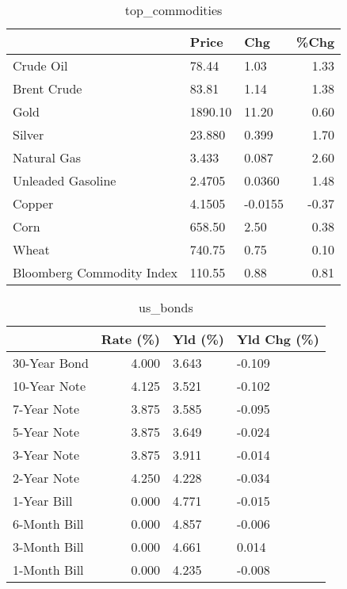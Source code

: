 \documentclass{article}%
\begin{document}
\begin{table}[htbp]%
\caption{top\_commodities}%
\centering%
\begin{adjustbox}{width=1\textwidth}%
\begin{tabular}{lllr}
\toprule
                          &   Price &     Chg &  \%Chg \\
\midrule
               Crude Oil  &   78.44 &    1.03 &  1.33 \\
             Brent Crude  &   83.81 &    1.14 &  1.38 \\
                    Gold  & 1890.10 &   11.20 &  0.60 \\
                  Silver  &  23.880 &   0.399 &  1.70 \\
             Natural Gas  &   3.433 &   0.087 &  2.60 \\
       Unleaded Gasoline  &  2.4705 &  0.0360 &  1.48 \\
                  Copper  &  4.1505 & -0.0155 & -0.37 \\
                    Corn  &  658.50 &    2.50 &  0.38 \\
                   Wheat  &  740.75 &    0.75 &  0.10 \\
Bloomberg Commodity Index &  110.55 &    0.88 &  0.81 \\
\bottomrule
\end{tabular}
%
\end{adjustbox}%
\end{table}

%


\begin{table}[htbp]%
\caption{us\_bonds}%
\centering%
\begin{adjustbox}{width=1\textwidth}%
\begin{tabular}{lrll}
\toprule
             &  Rate (\%) & Yld (\%) & Yld Chg (\%) \\
\midrule
30-Year Bond &     4.000 &   3.643 &      -0.109 \\
10-Year Note &     4.125 &   3.521 &      -0.102 \\
 7-Year Note &     3.875 &   3.585 &      -0.095 \\
 5-Year Note &     3.875 &   3.649 &      -0.024 \\
 3-Year Note &     3.875 &   3.911 &      -0.014 \\
 2-Year Note &     4.250 &   4.228 &      -0.034 \\
 1-Year Bill &     0.000 &   4.771 &      -0.015 \\
6-Month Bill &     0.000 &   4.857 &      -0.006 \\
3-Month Bill &     0.000 &   4.661 &       0.014 \\
1-Month Bill &     0.000 &   4.235 &      -0.008 \\
\bottomrule
\end{tabular}
%
\end{adjustbox}%
\end{table}
\end{document}
